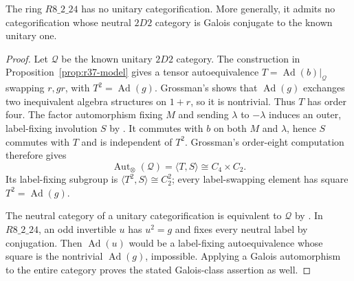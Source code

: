 \begin{proposition}\label{prop:scoped-eight}
The ring $R8\_2\_24$ has no unitary categorification. More
generally, it admits no categorification
whose neutral $2D2$ category is Galois conjugate to the known unitary
one.
\end{proposition}
\begin{proof}
Let $\mathcal Q$ be the known unitary $2D2$ category. The
construction in Proposition~\ref{prop:r37-model} gives a tensor
autoequivalence $T=\operatorname{Ad}(b)|_{\mathcal Q}$ swapping
$r,gr$, with $T^2=\operatorname{Ad}(g)$. Grossman's
\cite[Lemma~4.1]{Grossman} shows that $\operatorname{Ad}(g)$ exchanges
two inequivalent algebra structures on $1+r$, so it is nontrivial.
Thus $T$ has order four. The factor automorphism fixing $M$ and
sending $\lambda$ to $-\lambda$ induces an outer, label-fixing
involution $S$ by \cite[Lemma~4.2]{Grossman}. It commutes with $b$
on both $M$ and $\lambda$, hence $S$ commutes with $T$ and is
independent of $T^2$. Grossman's order-eight computation
\cite[Theorem~4.19 and its proof]{Grossman} therefore gives
\[
\operatorname{Aut}_{\otimes}(\mathcal Q)=\langle T,S\rangle
 \cong C_4\times C_2.
\]
Its label-fixing subgroup is $\langle T^2,S\rangle\cong C_2^2$;
every label-swapping element has square $T^2=\operatorname{Ad}(g)$.

The neutral category of a unitary categorification is equivalent to
$\mathcal Q$ by \cite[Theorem~3.31]{EIP}. In $R8\_2\_24$, an odd
invertible $u$ has $u^2=g$ and fixes every neutral label by conjugation.
Then $\operatorname{Ad}(u)$ would be a label-fixing autoequivalence
whose square is the nontrivial $\operatorname{Ad}(g)$, impossible.
Applying a Galois automorphism to the entire category proves the stated
Galois-class assertion as well.
\end{proof}
